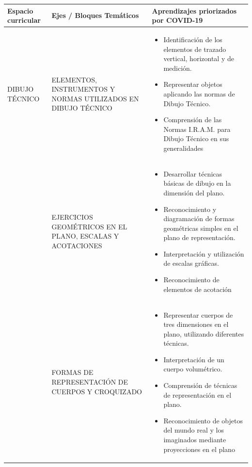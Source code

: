 \documentclass[../main]{subfiles}
\begin{document}
%
\clearpage\maketitle
\tableofcontents
\newpage

\begin{table}[]
    \centering
    \footnotesize
    \begin{tabular}{|p{3cm}|p{4cm}|p{8cm}|} \hline
        Espacio curricular & Ejes / Bloques Temáticos & Aprendizajes priorizados por COVID-19\\ \hline\hline
        DIBUJO TÉCNICO & ELEMENTOS, INSTRUMENTOS Y NORMAS UTILIZADOS EN DIBUJO TÉCNICO & \begin{itemize} \item Identificación de los elementos de trazado vertical, horizontal y de medición.
\item Representar objetos aplicando las normas de Dibujo Técnico.
\item Comprensión de las Normas I.R.A.M. para Dibujo
Técnico en sus generalidades\end{itemize} \\ \hline
         & EJERCICIOS GEOMÉTRICOS EN EL PLANO, ESCALAS Y ACOTACIONES & \begin{itemize}
             \item Desarrollar técnicas básicas de dibujo en la dimensión del plano. 
             \item Reconocimiento y diagramación de formas geométricas simples en el plano de representación. 
             \item Interpretación y utilización de escalas gráficas. 
             \item Reconocimiento de elementos de acotación
\end{itemize}
\\ \hline
 & FORMAS DE REPRESENTACIÓN DE CUERPOS Y CROQUIZADO & \begin{itemize} \item Representar cuerpos de tres dimensiones en el plano,
utilizando diferentes técnicas.
\item Interpretación de un cuerpo volumétrico.
\item Comprensión de técnicas de representación en el plano.
\item Reconocimiento de objetos del mundo real y los imaginados
mediante proyecciones en el plano\end{itemize}\\ \hline
    \end{tabular}
\end{table}
\end{document}
